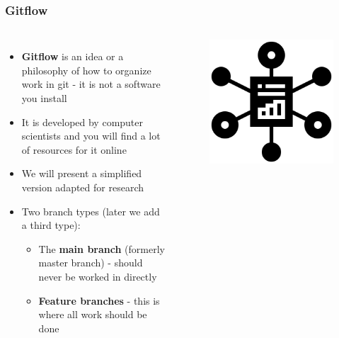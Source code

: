 \documentclass[aspectratio=169]{beamer} %
\begin{document}
\begin{frame}
	\frametitle{Gitflow}
	\begin{columns}[c]

		\begin{itemize}
			\setlength\itemsep{.5em}
			\item \textbf{Gitflow} is an idea or a philosophy 
			of how to organize work in git - it is not a software you install
			\item It is developed by computer scientists and
			you will find a lot of resources for it online
			\item We will present a simplified version adapted for research
			\item Two branch types (later we add a third type):
			\begin{itemize}
				\item The \textbf{main branch} (formerly master branch)
				- should never be worked in directly
				\item \textbf{Feature branches} - this is where all work should be done
			\end{itemize}
		\end{itemize}

		\vspace{-.75cm}
		\begin{figure}
			\centering
			\includegraphics[width=.75\textwidth]{./img/organization.png}
		\end{figure}
	\end{columns}
\end{frame}
\end{document}
